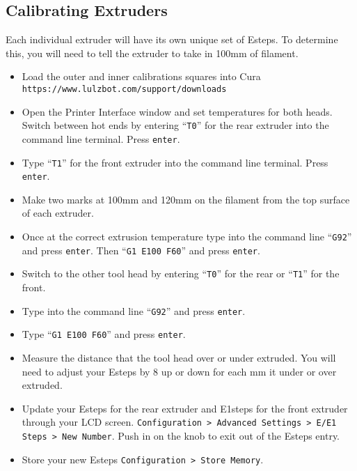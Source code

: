\subsection{Calibrating Extruders}
Each individual extruder will have its own unique set of Esteps. To determine this, you will need to tell the extruder to take in 100mm of filament.
\begin{itemize}
\item Load the outer and inner calibrations squares into Cura \texttt{https://www.lulzbot.com/support/downloads}
\item Open the Printer Interface window and set temperatures for both heads. Switch between hot ends by entering ``\texttt{T0}'' for the rear extruder into the command line terminal. Press \texttt{enter}.
\item Type ``\texttt{T1}'' for the front extruder into the command line terminal. Press \texttt{enter}.
\item Make two marks at 100mm and 120mm on the filament from the top surface of each extruder.
\item Once at the correct extrusion temperature type into the command line ``\texttt{G92}'' and press \texttt{enter}. Then ``\texttt{G1 E100 F60}'' and press \texttt{enter}.
\item Switch to the other tool head by entering ``\texttt{T0}'' for the rear or ``\texttt{T1}'' for the front. 
\item Type into the command line ``\texttt{G92}'' and press \texttt{enter}.
\item Type ``\texttt{G1 E100 F60}'' and press \texttt{enter}.
\item Measure the distance that the tool head over or under extruded. You will need to adjust your Esteps by 8 up or down for each mm it under or over extruded.
\item Update your Esteps for the rear extruder and E1steps for the front extruder through your LCD screen. \texttt{Configuration > Advanced Settings > E/E1 Steps > New Number}. Push in on the knob to exit out of the Esteps entry.
\item Store your new Esteps \texttt{Configuration > Store Memory}.
\end{itemize}

